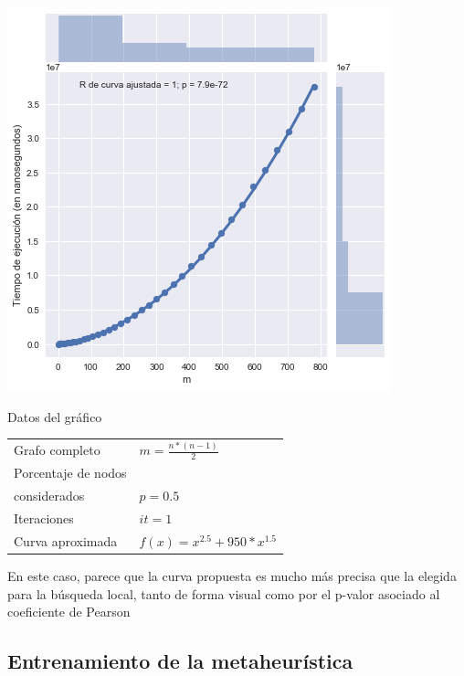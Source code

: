\noindent
\begin{minipage}{0.55\textwidth}
    \hfill
    \includegraphics[scale=0.6]{img/grasp-m.png}
\end{minipage}
\hfill
\begin{minipage}{0.44\textwidth}
    \begin{center}
        Datos del gráfico

        \begin{tabular}{ | l l |}
            \hline
            Grafo completo & $m = \frac{n * (n-1)}{2}$\\
            Porcentaje de nodos & \\
            considerados & $p = 0.5$ \\
            Iteraciones & $it = 1$ \\
            Curva aproximada & $f(x) = x^{2.5} + 950 * x^{1.5}$ \\
            \hline
        \end{tabular}
    \end{center}
\end{minipage}

En este caso, parece que la curva propuesta es mucho más precisa que la elegida para la búsqueda local, tanto de forma visual como por el p-valor asociado al coeficiente de Pearson

\subsection{Entrenamiento de la metaheurística}

